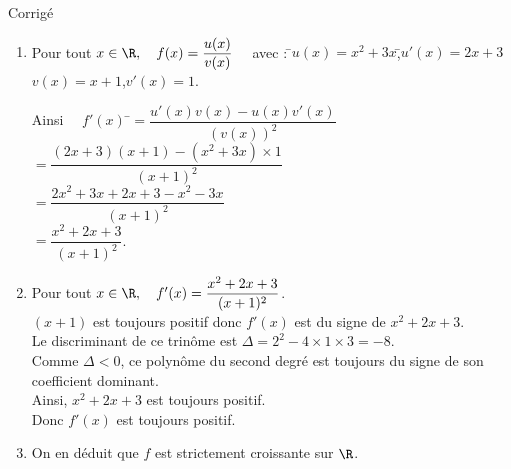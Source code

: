\documentclass[a4paper,11pt,exos]{nsi} %
\newcounter{corNum}
\newcommand{\cor}[1]
{
	\addtocounter{corNum}{1}
	{\titlefont\color{UGLiOrange}\Large Corrigé\ \thecorNum\ \normalsize{#1}}\smallskip	
}
\begin{document}
\cor{}
\begin{enumerate}
	\item 
	\begin{tabbing}
		Pour tout $x\in  \R, \quad f(x)=\dfrac{u(x)}{v(x)}\quad$ avec : \qquad \=$u(x)=x^2+3x$,\qquad \=$u'(x)=2x+3$\\
		\>$v(x)=x+1$,\>$v'(x)=1$.
	\end{tabbing}
	\begin{tabbing}
		Ainsi $\quad f'(x)$	\=$=\dfrac{u'(x)v(x)-u(x)v'(x)}{\left(v(x)\right)^2}$\\[.5em]
		\>	$=\dfrac{(2x+3)(x+1)-(x^2+3x)\times 1}{(x+1)^2}$\\[.5em]
		\>	$=\dfrac{2x^2+3x+2x+3-x^2-3x}{(x+1)^2}$\\[.5em]
		\>	$=\dfrac{x^2+2x+3}{(x+1)^2}$.
	\end{tabbing}
	\item Pour tout $x\in  \R, \quad f'(x)=\dfrac{x^2+2x+3}{(x+1)^2}$.\\
	$(x+1)$ est toujours positif donc $f'(x)$ est du signe de $x^2+2x+3$.\\
	Le discriminant de ce trinôme est $\Delta=2^2-4\times 1\times 3=-8$.\\
	Comme $\Delta<0$, ce polynôme du second degré est toujours du signe de son coefficient dominant.\\
	Ainsi, $x^2+2x+3$ est toujours positif.\\
	Donc $f'(x)$ est toujours positif.
	\item On en déduit que $f$ est strictement croissante sur $\R$.
\end{enumerate}
\end{document}
